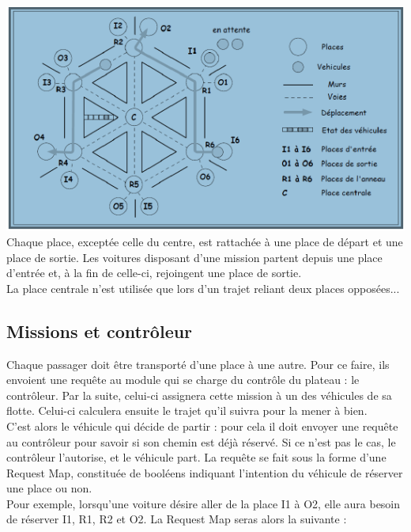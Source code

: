 \documentclass[a4paper, titlepage]{report}
\begin{document}
\includegraphics[]{Images/Plateau}
\vspace{0.5cm}
\\
Chaque place, exceptée celle du centre, est rattachée à une place de départ et une place de sortie. Les voitures disposant d'une mission partent depuis une place d'entrée et, à la fin de celle-ci, rejoingent une place de sortie.\\
La place centrale n'est utilisée que lors d'un trajet reliant deux places opposées...
\subsection{Missions et contrôleur}
Chaque passager doit être transporté d'une place à une autre. Pour ce faire, ils envoient une requête au module qui se charge du contrôle du plateau : le contrôleur. Par la suite, celui-ci assignera cette mission à un des véhicules de sa flotte. Celui-ci calculera ensuite le trajet qu'il suivra pour la mener à bien.\\
C'est alors le véhicule qui décide de partir : pour cela il doit envoyer une requête au contrôleur pour savoir si son chemin est déjà réservé. Si ce n'est pas le cas, le contrôleur l'autorise, et le véhicule part. La requête se fait sous la forme d'une Request Map, constituée de booléens indiquant l'intention du véhicule de réserver une place ou non.\\
Pour exemple, lorsqu'une voiture désire aller de la place I1 à O2, elle aura besoin de réserver I1, R1, R2 et O2. La Request Map seras alors la suivante :
\vspace{0.5cm}
\end{document}

